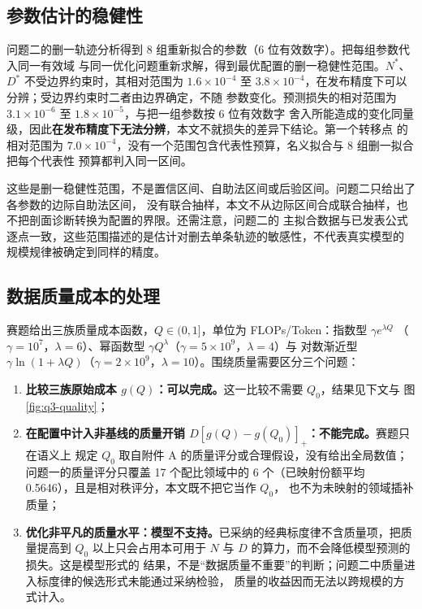 \subsection{参数估计的稳健性}

问题二的删一轨迹分析得到 8 组重新拟合的参数（6 位有效数字）。把每组参数代入同一有效域
与同一优化问题重新求解，得到最优配置的删一稳健性范围。$N^*$、$D^*$ 不受边界约束时，其相对范围为
$1.6\times10^{-4}$ 至 $3.8\times10^{-4}$，在发布精度下可以分辨；受边界约束时二者由边界确定，不随
参数变化。预测损失的相对范围为 $3.1\times10^{-6}$ 至 $1.8\times10^{-5}$，与把一组参数按 6 位有效数字
舍入所能造成的变化同量级，因此\textbf{在发布精度下无法分辨}，本文不就损失的差异下结论。第一个转移点
的相对范围为 $7.0\times10^{-4}$，没有一个范围包含代表性预算，名义拟合与 8 组删一拟合把每个代表性
预算都判入同一区间。

这些是删一稳健性范围，不是置信区间、自助法区间或后验区间。问题二只给出了各参数的边际自助法区间，
没有联合抽样，本文不从边际区间合成联合抽样，也不把剖面诊断转换为配置的界限。还需注意，问题二的
主拟合数据与已发表公式逐点一致，这些范围描述的是估计对删去单条轨迹的敏感性，不代表真实模型的
规模规律被确定到同样的精度。

\subsection{数据质量成本的处理}

赛题给出三族质量成本函数，$Q\in(0,1]$，单位为 FLOPs/Token：指数型 $\gamma e^{\lambda Q}$
（$\gamma=10^{7}$，$\lambda=6$）、幂函数型 $\gamma Q^{\lambda}$（$\gamma=5\times10^{9}$，$\lambda=4$）与
对数渐近型 $\gamma\ln(1+\lambda Q)$（$\gamma=2\times10^{9}$，$\lambda=10$）。围绕质量需要区分三个问题：
\begin{enumerate}
  \item \textbf{比较三族原始成本 $g(Q)$：可以完成。}这一比较不需要 $Q_0$，结果见下文与
        图\ref{fig:q3-quality}；
  \item \textbf{在配置中计入非基线的质量开销 $D[g(Q)-g(Q_0)]_{+}$：不能完成。}赛题只在语义上
        规定 $Q_0$ 取自附件 A 的质量评分或合理假设，没有给出全局数值；问题一的质量评分只覆盖
        17 个配比领域中的 6 个（已映射份额平均 0.5646），且是相对秩评分，本文既不把它当作 $Q_0$，
        也不为未映射的领域插补质量；
  \item \textbf{优化非平凡的质量水平：模型不支持。}已采纳的经典标度律不含质量项，把质量提高到
        $Q_0$ 以上只会占用本可用于 $N$ 与 $D$ 的算力，而不会降低模型预测的损失。这是模型形式的
        结果，不是“数据质量不重要”的判断；问题二中质量进入标度律的候选形式未能通过采纳检验，
        质量的收益因而无法以跨规模的方式计入。
\end{enumerate}

